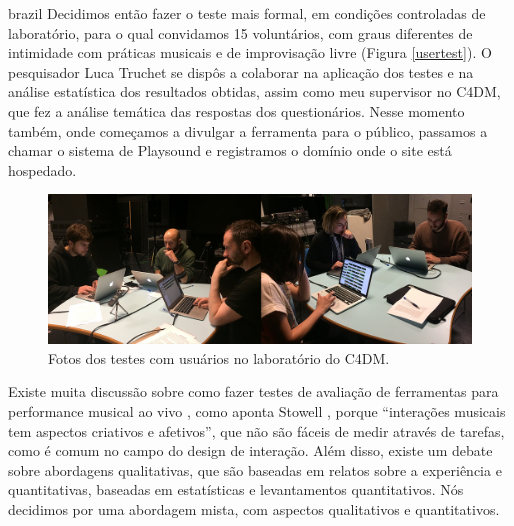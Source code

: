 \begin{otherlanguage*}{brazil}
Decidimos então fazer o teste mais formal, em condições controladas de laboratório, para o qual convidamos 15 voluntários, com graus diferentes de intimidade com práticas musicais e de improvisação livre (Figura \ref{usertest}). O pesquisador Luca Truchet se dispôs a colaborar na aplicação dos testes e na análise estatística dos resultados obtidas, assim como meu supervisor no C4DM, que fez a análise temática das respostas dos questionários. Nesse momento também, onde começamos a divulgar a ferramenta para o público, passamos a chamar o sistema de Playsound e registramos o domínio onde o site está hospedado.


\begin{figure}
\centering
\includegraphics[width=1\textwidth]{pictures/cap4/usertest}
\caption{\label{usertest}Fotos dos testes com usuários no laboratório do C4DM.}
\label{fig:SUS}
\end{figure}


Existe muita discussão sobre como fazer testes de avaliação de ferramentas para performance musical ao vivo \cite{Barbosa2015}, como aponta Stowell \cite{Stowell}, porque ``interações musicais tem aspectos criativos e afetivos'', que não são fáceis de medir através de tarefas, como é comum no campo do design de interação. Além disso, existe um debate sobre abordagens qualitativas, que são baseadas em relatos sobre a experiência e quantitativas, baseadas em estatísticas e levantamentos quantitativos. Nós decidimos por uma abordagem mista, com aspectos qualitativos e quantitativos.


\end{otherlanguage*}
